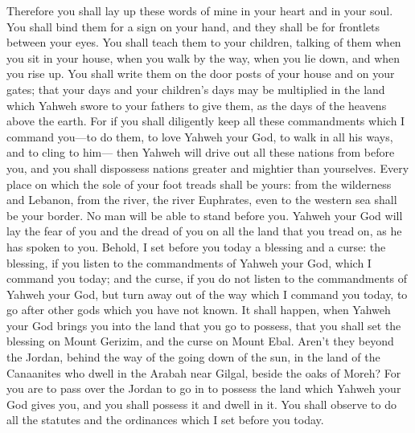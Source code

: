 {Therefore you shall lay up these words of mine in your heart and in your soul. You shall bind them for a sign on your hand, and they shall be for frontlets between your eyes.
You shall teach them to your children, talking of them when you sit in your house, when you walk by the way, when you lie down, and when you rise up.
You shall write them on the door posts of your house and on your gates;
that your days and your children’s days may be multiplied in the land which Yahweh swore to your fathers to give them, as the days of the heavens above the earth.
For if you shall diligently keep all these commandments which I command you—to do them, to love Yahweh your God, to walk in all his ways, and to cling to him—
then Yahweh will drive out all these nations from before you, and you shall dispossess nations greater and mightier than yourselves.
Every place on which the sole of your foot treads shall be yours: from the wilderness and Lebanon, from the river, the river Euphrates, even to the western sea shall be your border.
No man will be able to stand before you. Yahweh your God will lay the fear of you and the dread of you on all the land that you tread on, as he has spoken to you.
Behold, I set before you today a blessing and a curse:
the blessing, if you listen to the commandments of Yahweh your God, which I command you today;
and the curse, if you do not listen to the commandments of Yahweh your God, but turn away out of the way which I command you today, to go after other gods which you have not known.
It shall happen, when Yahweh your God brings you into the land that you go to possess, that you shall set the blessing on Mount Gerizim, and the curse on Mount Ebal.
Aren’t they beyond the Jordan, behind the way of the going down of the sun, in the land of the Canaanites who dwell in the Arabah near Gilgal, beside the oaks of Moreh?
For you are to pass over the Jordan to go in to possess the land which Yahweh your God gives you, and you shall possess it and dwell in it.
You shall observe to do all the statutes and the ordinances which I set before you today.

}
